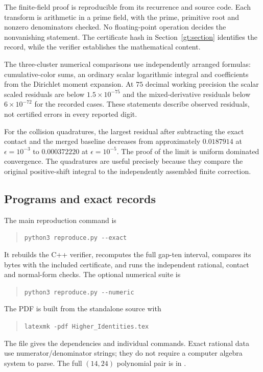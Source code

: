 The finite-field proof is reproducible from its recurrence and
source code. Each transform is arithmetic in a prime field, with
the prime, primitive root and nonzero denominators checked.
No floating-point operation decides the nonvanishing statement.
The certificate hash in Section~\ref{gt:section} identifies the
record, while the verifier establishes the mathematical content.

The three-cluster numerical comparisons use independently arranged
formulas: cumulative-color sums, an ordinary scalar logarithmic
integral and coefficients from the Dirichlet moment expansion.
At $75$ decimal working precision the scalar scaled residuals are
below $1.5\times10^{-75}$ and the mixed-derivative residuals below
$6\times10^{-72}$ for the recorded cases. These statements describe
observed residuals, not certified errors in every reported digit.

For the collision quadratures, the largest residual after subtracting
the exact contact and the merged baseline decreases from approximately
$0.0187914$ at $\epsilon=10^{-3}$ to $0.000372220$ at
$\epsilon=10^{-5}$. The proof of the limit is uniform dominated
convergence. The quadratures are useful precisely because they compare
the original positive-shift integral to the independently assembled
finite correction.

\subsection{Programs and exact records}

The main reproduction command is
\begin{quote}
\verb|python3 reproduce.py --exact|
\end{quote}
It rebuilds the C++ verifier, recomputes the full gap-ten interval,
compares its bytes with the included certificate, and runs the
independent rational, contact and normal-form checks.
The optional numerical suite is
\begin{quote}
\verb|python3 reproduce.py --numeric|
\end{quote}
The PDF is built from the standalone source with
\begin{quote}
\verb|latexmk -pdf Higher_Identities.tex|
\end{quote}
The file  gives the dependencies and individual
commands. Exact rational data use numerator/denominator strings;
they do not require a computer algebra system to parse.
The full $(14,24)$ polynomial pair is in
.

